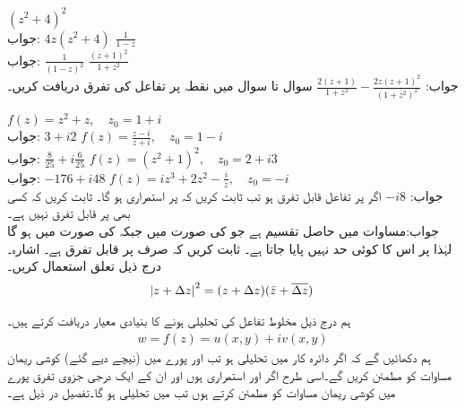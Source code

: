 \quad
$(z^2+4)^2$\\
جواب:\quad
$4z(z^2+4)$
\quad
$\tfrac{1}{1-z}$\\
جواب:\quad
$\tfrac{1}{(1-z)^2}$
\quad
$\tfrac{(z+1)^2}{1+z^2}$\\
جواب:\quad
$\tfrac{2(z+1)}{1+z^2}-\tfrac{2z(z+1)^2}{(1+z^2)^2}$
سوال  تا سوال  میں نقطہ  پر تفاعل کی تفرق دریافت کریں۔

\quad
$f(z)=z^2+z,\quad z_0=1+i$\\
جواب:\quad
$3+i2$
\quad
$f(z)=\tfrac{z-i}{z+i},\quad z_0=1-i$\\
جواب:\quad
$\tfrac{8}{25}+i\tfrac{6}{25}$
\quad
$f(z)=(z^2+1)^2,\quad z_0=2+i3$\\
جواب:\quad
$-176+i48$
\quad
$f(z)=iz^3+2z^2-\tfrac{i}{z},\quad z_0=-i$\\
جواب:\quad
$-i8$
\quad
اگر  پر تفاعل  قابل تفرق ہو تب ثابت کریں کہ  پر  استمراری ہو گا۔
\quad
ثابت کریں کہ  کسی بھی  پر قابل تفرق نہیں ہے۔\\
جواب:\quad مساوات  میں حاصل تقسیم  ہے جو  کی صورت میں  جبکہ  کی صورت میں  ہو گا لہٰذا  پر اس کا کوئی حد نہیں پایا جاتا ہے۔
\quad
ثابت کریں کہ  صرف  پر قابل تفرق ہے۔ اشارہ۔ درج ذیل تعلق استعمال کریں۔
\begin{align*}
\abs{z+\Delta z}^2=(z+\Delta z)(\bar{z}+\overline{\Delta z})
\end{align*}

ہم درج ذیل مخلوط تفاعل کی تحلیلی ہونے  کا بنیادی معیار دریافت کرتے ہیں۔
\begin{align}\label{مساوات_مخلوط_کوشی_ریمان_ثبوت_الف}
w=f(z)=u(x,y)+iv(x,y)
\end{align}
ہم دکھائیں گے کہ اگر دائرہ کار  میں  تحلیلی ہو تب  اور  پورے  میں (نیچے دیے گئے) کوشی ریمان مساوات کو مطمئن کریں گے۔اسی طرح اگر   اور  استمراری ہوں اور ان کے ایک درجی جزوی تفرق پورے  میں   کوشی ریمان مساوات   کو مطمئن کرتے ہوں تب  میں  تحلیلی ہو گا۔تفصیل در ذیل ہے۔ 

